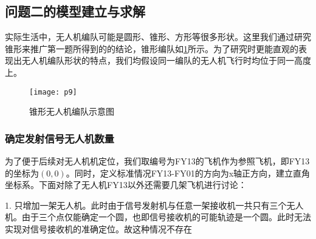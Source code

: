 \documentclass{cumcmthesis}
\begin{document}
	

\subsection{问题二的模型建立与求解}
实际生活中，无人机编队可能是圆形、锥形、方形等很多形状。这里我们通过研究锥形来推广第一题所得到的的结论，锥形编队如\cref{fig:p9}所示。为了研究时更能直观的表现出无人机编队形状的特点，我们均假设同一编队的无人机飞行时均位于同一高度上。
\begin{figure}[H]
	\centering
	\texttt{[image: p9]}
	\caption{锥形无人机编队示意图}
	\label{fig:p9}
\end{figure}
\subsubsection{确定发射信号无人机数量}
为了便于后续对无人机机定位，我们取编号为FY13的飞机作为参照飞机，即FY13的坐标为$(0,0)$。同时，定义标准情况FY13-FY01的方向为x轴正方向，建立直角坐标系。下面对除了无人机FY13以外还需要几架飞机进行讨论：

1. 只增加一架无人机。此时由于信号发射机与任意一架接收机一共只有三个无人机。由于三个点仅能确定一个圆，也即信号接收机的可能轨迹是一个圆。此时无法实现对信号接收机的准确定位。故这种情况不存在
 
\end{document}
